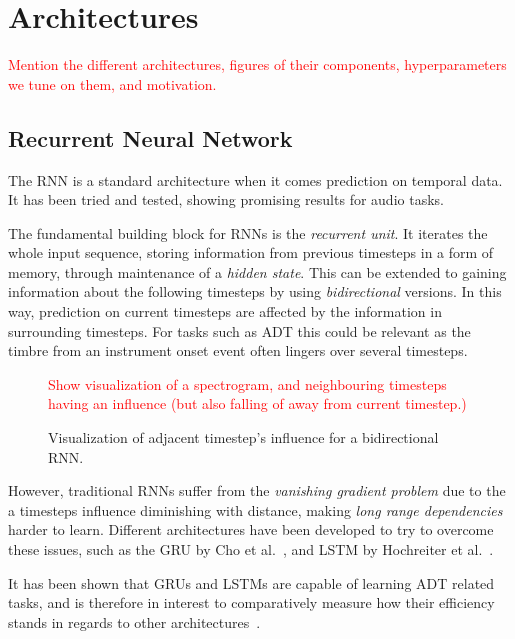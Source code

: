 \chapter{Architectures}

\textcolor{red}{Mention the different architectures, figures of their components, hyperparameters we tune on them, and motivation.}

\section{Recurrent Neural Network}

The \gls{RNN} is a standard architecture when it comes prediction on temporal data. It has been tried and tested, showing promising results for audio tasks.

The fundamental building block for \gls{RNN}s is the \textit{recurrent unit}. It iterates the whole input sequence, storing information from previous timesteps in a form of memory, through maintenance of a \textit{hidden state}. This can be extended to gaining information about the following timesteps by using \textit{bidirectional} versions. In this way, prediction on current timesteps are affected by the information in surrounding timesteps. For tasks such as \gls{ADT} this could be relevant as the timbre from an instrument onset event often lingers over several timesteps.

\begin{figure}[H]
    \centering
    \textcolor{red}{Show visualization of a spectrogram, and neighbouring timesteps having an influence (but also falling of away from current timestep.)}
    \caption{Visualization of adjacent timestep's influence for a bidirectional RNN.}
    \label{RNNInfluenceFigure}
\end{figure}

However, traditional \gls{RNN}s suffer from the \textit{vanishing gradient problem} due to the a timesteps influence diminishing with distance, making \textit{long range dependencies} harder to learn. Different architectures have been developed to try to overcome these issues, such as the \gls{GRU} by Cho et al.~\cite{DBLP:conf/emnlp/ChoMGBBSB14}, and \gls{LSTM} by Hochreiter et al.~\cite{10.1162/neco.1997.9.8.1735}.

It has been shown that \gls{GRU}s and \gls{LSTM}s are capable of learning \gls{ADT} related tasks, and is therefore in interest to comparatively measure how their efficiency stands in regards to other architectures~\cite{Southall2016AutomaticDT, inproceedings, Vogl2017DrumTV, signals4040042}.


